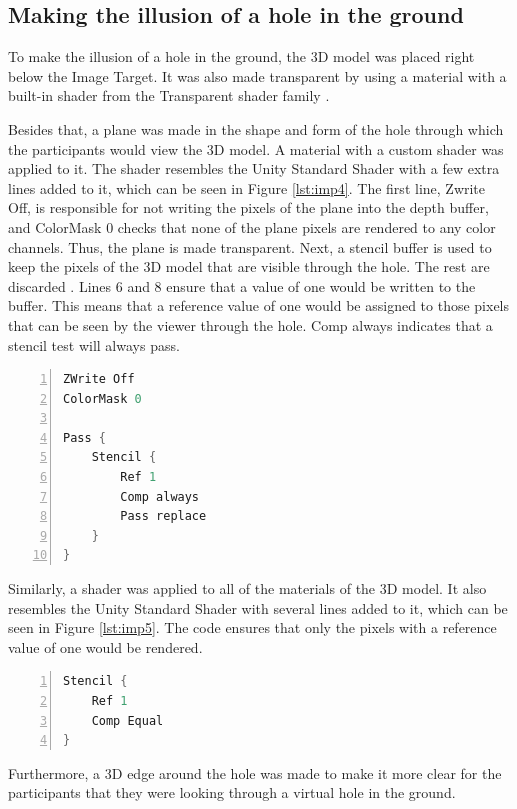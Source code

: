 \subsection{Making the illusion of a hole in the ground}
To make the illusion of a hole in the ground, the 3D model was placed right below the Image Target. It was also made transparent by using a material with a built-in shader from the Transparent shader family \cite{unity_legacy_shaders}.

Besides that, a plane was made in the shape and form of the hole through which the participants would view the 3D model. A material with a custom shader was applied to it. The shader resembles the Unity Standard Shader \cite{unity_standard_shader} with  a few extra lines added to it, which can be seen in Figure \ref{lst:imp4}. The first line, Zwrite Off, is responsible for not writing the pixels of the plane into the depth buffer, and ColorMask 0 checks that none of the plane pixels are rendered to any color channels. Thus, the plane is made transparent. Next, a stencil buffer is used to keep the pixels of the 3D model that are visible through the hole. The rest are discarded \cite{stencil_buffer}. Lines 6 and 8 ensure that a value of one would be written to the buffer. This means that a reference value of one would be assigned to those pixels that can be seen by the viewer through the hole. Comp always indicates that a stencil test will always pass.

\begin{lstlisting}[language=C, numbers=left, caption={Extra code for the hole}, label=lst:imp4, captionpos=b]
ZWrite Off
ColorMask 0

Pass {
	Stencil {
		Ref 1
		Comp always
		Pass replace
	}
}
\end{lstlisting}

Similarly, a shader was applied to all of the materials of the 3D model. It also resembles the Unity Standard Shader with several lines added to it, which can be seen in Figure \ref{lst:imp5}. The code ensures that only the pixels with a reference value of one would be rendered.

\begin{lstlisting}[language=C, numbers=left, caption={Extra code for the 3D model}, label=lst:imp5, captionpos=b]
Stencil {
	Ref 1
	Comp Equal
}
\end{lstlisting}

Furthermore, a 3D edge around the hole was made to make it more clear for the participants that they were looking through a virtual hole in the ground.


